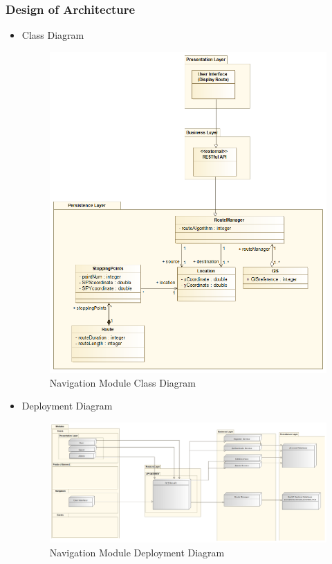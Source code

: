 \documentclass{article}
\begin{document}
		\subsubsection{Design of Architecture}
				
			\begin{itemize}
 				\item Class Diagram
 				\begin{center}
 					\begin{figure}[!h]
 						\includegraphics[scale=0.275]{navigationCD.png}
 						\caption{Navigation Module Class Diagram}
 					\end{figure}
 				\end{center}
 				\pagebreak
			
			\item Deployment Diagram
			\begin{center}
				\begin{figure}[!h]
					\includegraphics[angle=90, scale=0.35]{navigationDeploymentDiagram.png}
					\caption{Navigation Module Deployment Diagram}
				\end{figure}
			\end{center}
			\pagebreak
			

\end{itemize}
\end{document}
